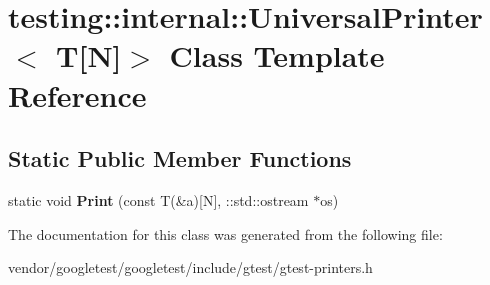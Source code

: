 \hypertarget{classtesting_1_1internal_1_1_universal_printer_3_01_t[_n]_4}{}\section{testing\+:\+:internal\+:\+:Universal\+Printer$<$ T\mbox{[}N\mbox{]}$>$ Class Template Reference}
\label{classtesting_1_1internal_1_1_universal_printer_3_01_t[_n]_4}
\subsection*{Static Public Member Functions}
\begin{DoxyCompactItemize}
\item 
\mbox{\label{classtesting_1_1internal_1_1_universal_printer_3_01_t[_n]_4_a1cf0e7c8db59c090f769116c6421b212}} 
static void {\bfseries Print} (const T(\&a)\mbox{[}N\mbox{]}, \+::std\+::ostream $\ast$os)
\end{DoxyCompactItemize}


The documentation for this class was generated from the following file\+:\begin{DoxyCompactItemize}
\item 
vendor/googletest/googletest/include/gtest/gtest-\/printers.\+h\end{DoxyCompactItemize}
